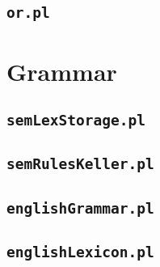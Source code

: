 \documentclass[notitlepage,twoside,a4paper]{scrreprt}
\newcommand{\code}[1]{\texttt{#1}} %
\theoremstyle{remark}
\theoremstyle{remark}
\theoremstyle{definition}
\theoremstyle{definition}
\begin{document}


\subsection{\code{or.pl}}


\section{Grammar}
\subsection{\code{semLexStorage.pl}}


\subsection{\code{semRulesKeller.pl}}


\subsection{\code{englishGrammar.pl}}


\subsection{\code{englishLexicon.pl}}


\newpage


\end{document}
